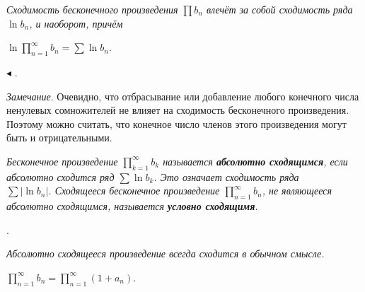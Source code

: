 \begin{approval}
\slshape{Сходимость бесконечного произведения $\prod b_{n}$ влечёт за собой сходимость ряда $\ln{b_{n}}$, и 
наоборот, причём}
\begin{center}
$\ln{\prod\limits_{n=1}^{\infty}b_{n} = \sum{\ln{b_{n}}}}$.
\end{center}
$\blacktriangleleft$
\upshape\mdseries{}.
\end{approval}

\textit{Замечание}. Очевидно, что отбрасывание или добавление любого конечного числа ненулевых сомножителей не влияет на сходимость бесконечного произведения. Поэтому можно считать, что конечное число членов этого произведения могут быть и отрицательными.

\begin{object}
\slshape{Бесконечное произведение $\prod\limits_{k=1}^{\infty}b_{k}$ называется} 
\upshape\mdseries\rmfamily\textbf{абсолютно сходящимся},
\slshape{если абсолютно сходится ряд $\sum{\ln{b_{k}}}$. Это означает сходимость ряда \\$\sum|\ln{b_n}|$.
Сходящееся бесконечное произведение $\prod\limits_{n=1}^{\infty}b_{n}$, не являющееся абсолютно сходящимся,
называется \upshape\mdseries\rmfamily\textbf{условно сходящимя}}.

\upshape\mdseries{}.
\end{object}

\begin{theorem}
\slshape{Абсолютно сходящееся произведение всегда сходится в обычном смысле}.

\upshape\mdseries{} 
\begin{center}
$\prod\limits_{n=1}^{\infty}b_{n} = \prod\limits_{n=1}^{\infty}(1 + a_{n})$.
\end{center}
\end{theorem}

